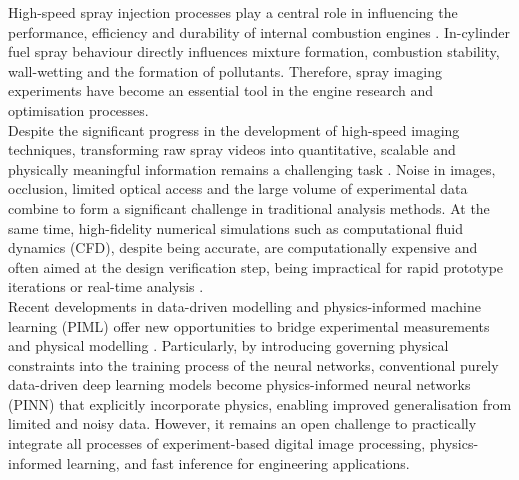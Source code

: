 \documentclass[english, 12pt, a4paper, elec, utf8, a-2b, online]{aaltothesis}
\begin{document}


High-speed spray injection processes play a central role in influencing the performance, efficiency and durability of internal combustion engines \cite{HeywoodICE}. In-cylinder fuel spray behaviour directly influences mixture formation, combustion stability, wall-wetting and the formation of pollutants. Therefore, spray imaging experiments have become an essential tool in the engine research and optimisation processes.\\

Despite the significant progress in the development of high-speed imaging techniques, transforming raw spray videos into quantitative, scalable and physically meaningful information remains a challenging task \cite{Linne2013SprayImaging}. Noise in images, occlusion, limited optical access and the large volume of experimental data combine to form a significant challenge in traditional analysis methods. At the same time, high-fidelity numerical simulations such as computational fluid dynamics (CFD), despite being accurate, are computationally expensive and often aimed at the design verification step, being impractical for rapid prototype iterations or real-time analysis \cite{NASACFDVision2030}.\\

Recent developments in data-driven modelling and physics-informed machine learning (PIML) offer new opportunities to bridge experimental measurements and physical modelling \cite{Raissi2019PINN,Karniadakis2021PIML}. Particularly, by introducing governing physical constraints into the training process of the neural networks, conventional purely data-driven deep learning models become physics-informed neural networks (PINN) that explicitly incorporate physics, enabling improved generalisation from limited and noisy data. However, it remains an open challenge to practically integrate all processes of experiment-based digital image processing, physics-informed learning, and fast inference for engineering applications.\\
\end{document}
